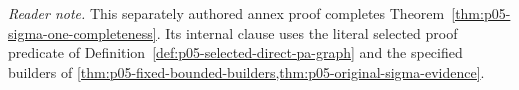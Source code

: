 
\noindent\textit{Reader note.}  This separately authored annex proof completes
Theorem~\ref{thm:p05-sigma-one-completeness}. Its internal clause uses the
literal selected proof predicate of
Definition~\ref{def:p05-selected-direct-pa-graph} and the specified builders
of \cref{thm:p05-fixed-bounded-builders,thm:p05-original-sigma-evidence}.

